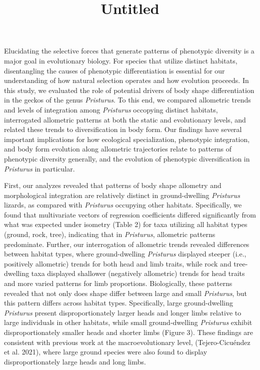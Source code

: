 \documentclass[
  11pt,
]{article}
\title{Untitled}
\author{}
\date{\vspace{-2.5em}}
\begin{document}
\maketitle

Elucidating the selective forces that generate patterns of phenotypic
diversity is a major goal in evolutionary biology. For species that
utilize distinct habitats, disentangling the causes of phenotypic
differentiation is essential for our understanding of how natural
selection operates and how evolution proceeds. In this study, we
evaluated the role of potential drivers of body shape differentiation in
the geckos of the genus \emph{Pristurus}. To this end, we compared
allometric trends and levels of integration among \emph{Pristurus}
occopying distinct habitats, interrogated allometric patterns at both
the static and evolutionary levels, and related these trends to
diversification in body form. Our findings have several important
implications for how ecological specialization, phenotypic integration,
and body form evolution along allometric trajectories relate to patterns
of phenotypic diversity generally, and the evolution of phenotypic
diversification in \emph{Pristurus} in particular. \hfill\break

First, our analyzes revealed that patterns of body shape allometry and
morphological integration are relatively distinct in ground-dwelling
\emph{Pristurus} lizards, as compared with \emph{Pristurus} occupying
other habitats. Specifically, we found that multivariate vectors of
regression coefficients differed significantly from what was expected
under isometry (Table 2) for taxa utilizing all habitat types (ground,
rock, tree), indicating that in \emph{Pristurus}, allometric patterns
predominate. Further, our interrogation of allometric trends revealed
differences between habitat types, where ground-dwelling
\emph{Pristurus} displayed steeper (i.e., positively allometric) trends
for both head and limb traits, while rock and tree-dwelling taxa
displayed shallower (negatively allometric) trends for head traits and
more varied patterns for limb proportions. Biologically, these patterns
revealed that not only does shape differ between large and small
\emph{Pristurus}, but this pattern differs across habitat types.
Specifically, large ground-dwelling \emph{Pristurus} present
disproportionately larger heads and longer limbs relative to large
individuals in other habitats, while small ground-dwelling
\emph{Pristurus} exhibit disproportionately smaller heads and shorter
limbs (Figure 3). These findings are consistent with previous work at
the macroevolutionary level, (Tejero-Cicuéndez et al. 2021), where large
ground species were also found to display disproportionately large heads
and long limbs. \hfill\break
\end{document}
